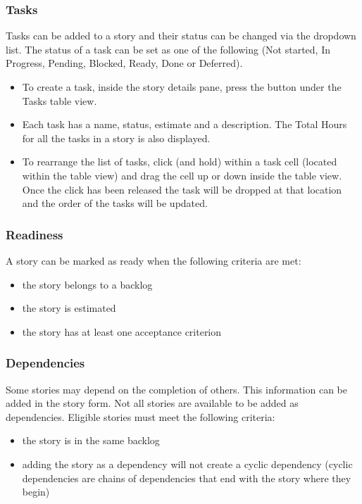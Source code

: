 \documentclass[11pt,fleqn]{book} %
\begin{document}
\subsubsection{Tasks}
Tasks can be added to a story and their status can be changed via the dropdown list.
The status of a task can be set as one of the following (Not started, In Progress, Pending, Blocked, Ready, Done or Deferred).
\begin{itemize}
   \item To create a task, inside the story details pane, press the \menu{+} button under the Tasks table view.
   \item Each task has a name, status, estimate and a description. The Total Hours for all the tasks in a story is also displayed.
   \item To rearrange the list of tasks, click (and hold) within a task cell (located within the table view)
   and drag the cell up or down inside the table view. Once the click has been released the task will be dropped at
   that location and the order of the tasks will be updated.
\end{itemize}

\subsubsection{Readiness}
A story can be marked as ready when the following criteria are met:
\begin{itemize}
\item the story belongs to a backlog
\item the story is estimated
\item the story has at least one acceptance criterion
\end{itemize}

\subsubsection{Dependencies}
Some stories may depend on the completion of others. This information can be
added in the story form. 
Not all stories are available to be added as dependencies. Eligible stories must
meet the following criteria:
\begin{itemize}
\item the story is in the same backlog
\item adding the story as a dependency will not create a cyclic dependency
(cyclic dependencies are chains of dependencies that end with the story where
they begin)
\end{itemize}
\end{document}
